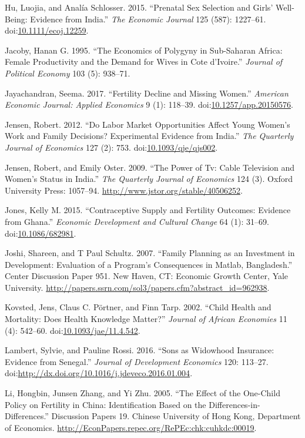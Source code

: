\documentclass[]{article}
\begin{document}
Hu, Luojia, and Analía Schlosser. 2015. ``Prenatal Sex Selection and Girls' Well-Being: Evidence from India.'' \emph{The Economic Journal} 125 (587): 1227--61. doi:\href{https://doi.org/10.1111/ecoj.12259}{10.1111/ecoj.12259}.

Jacoby, Hanan G. 1995. ``The Economics of Polygyny in Sub-Saharan Africa: Female Productivity and the Demand for Wives in Cote d'Ivoire.'' \emph{Journal of Political Economy} 103 (5): 938--71.

Jayachandran, Seema. 2017. ``Fertility Decline and Missing Women.'' \emph{American Economic Journal: Applied Economics} 9 (1): 118--39. doi:\href{https://doi.org/10.1257/app.20150576}{10.1257/app.20150576}.

Jensen, Robert. 2012. ``Do Labor Market Opportunities Affect Young Women's Work and Family Decisions? Experimental Evidence from India.'' \emph{The Quarterly Journal of Economics} 127 (2): 753. doi:\href{https://doi.org/10.1093/qje/qjs002}{10.1093/qje/qjs002}.

Jensen, Robert, and Emily Oster. 2009. ``The Power of Tv: Cable Television and Women's Status in India.'' \emph{The Quarterly Journal of Economics} 124 (3). Oxford University Press: 1057--94. \url{http://www.jstor.org/stable/40506252}.

Jones, Kelly M. 2015. ``Contraceptive Supply and Fertility Outcomes: Evidence from Ghana.'' \emph{Economic Development and Cultural Change} 64 (1): 31--69. doi:\href{https://doi.org/10.1086/682981}{10.1086/682981}.

Joshi, Shareen, and T Paul Schultz. 2007. ``Family Planning as an Investment in Development: Evaluation of a Program's Consequences in Matlab, Bangladesh.'' Center Discussion Paper 951. New Haven, CT: Economic Growth Center, Yale University. \url{http://papers.ssrn.com/sol3/papers.cfm?abstract_id=962938}.

Kovsted, Jens, Claus C. Pörtner, and Finn Tarp. 2002. ``Child Health and Mortality: Does Health Knowledge Matter?'' \emph{Journal of African Economies} 11 (4): 542--60. doi:\href{https://doi.org/10.1093/jae/11.4.542}{10.1093/jae/11.4.542}.

Lambert, Sylvie, and Pauline Rossi. 2016. ``Sons as Widowhood Insurance: Evidence from Senegal.'' \emph{Journal of Development Economics} 120: 113--27. doi:\href{https://doi.org/http://dx.doi.org/10.1016/j.jdeveco.2016.01.004}{http://dx.doi.org/10.1016/j.jdeveco.2016.01.004}.

Li, Hongbin, Junsen Zhang, and Yi Zhu. 2005. ``The Effect of the One-Child Policy on Fertility in China: Identification Based on the Differences-in-Differences.'' Discussion Papers 19. Chinese University of Hong Kong, Department of Economics. \url{http://EconPapers.repec.org/RePEc:chk:cuhkdc:00019}.
\end{document}
